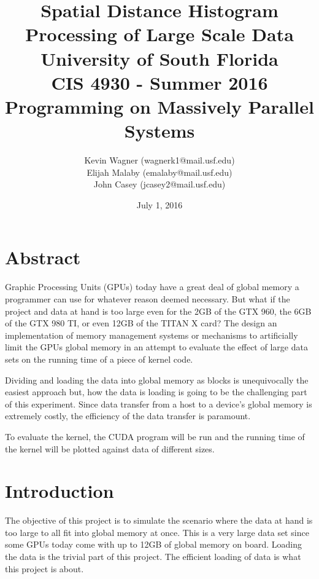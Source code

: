 \documentclass[twocolumn]{article}
\title{\textbf{Spatial Distance Histogram Processing
	   of Large Scale Data} \\
	   University of South Florida\\
	   CIS 4930 - Summer 2016\\
	   Programming on Massively Parallel Systems}
\author{Kevin Wagner (wagnerk1@mail.usf.edu)\\
		Elijah Malaby (emalaby@mail.usf.edu)\\
		John Casey (jcasey2@mail.usf.edu)}
\date{July 1, 2016}
\begin{document}
	\maketitle
	\newpage
	
	\newpage
  

\section{Abstract}
\par Graphic Processing Units (GPUs) today have a great deal of global memory a programmer can use for whatever reason deemed necessary. But what if the project and data at hand is too large even for the 2GB of the GTX 960, the 6GB of the GTX 980 TI, or even 12GB of the TITAN X card? The design an implementation of memory management systems or mechanisms to artificially limit the GPUs  global memory in an attempt to evaluate the effect of large data sets on the running time of a piece of kernel code.
\par Dividing and loading the data into global memory as blocks is unequivocally the easiest approach but, how the data is loading is going to be the challenging part of this experiment. Since data transfer from a host to a device's global memory is extremely costly, the efficiency of the data transfer is paramount.
\par{}To evaluate the kernel, the CUDA program will be run and the running time of the kernel will be plotted against data of different sizes.



\section{Introduction}
\par The objective of this project is to simulate the scenario where the data at hand is too large to all fit into global memory at once. This is a very large data set since some GPUs today come with up to 12GB of global memory on board. Loading the data is the trivial part of this project. The efficient loading of data is what this project is about. 
 
\end{document}
